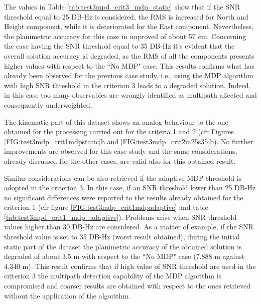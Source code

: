 The values in Table \ref{tab:test3mpd_crit3_mdp_static} show that if the SNR threshold equal to 25 DB-Hz is considered, the RMS is increased for North and Height component, while it is deteriorated for the East component. Nevertheless, the planimetric accuracy for this case in improved of about 57 cm. 
Concerning the case having the SNR threshold equal to 35 DB-Hz it's evident that the overall solution accuracy id degraded, as the RMS of all the components presents higher values with respect to the ``No MDP" case. This results confirms what has already been observed for the previous case study, i.e., using the MDP algorithm with high SNR threshold in the criterion 3 leads to a degraded solution. Indeed, 
in this case too many observables are wrongly identified as multipath affected and consequently underweighted.

The kinematic part of this dataset shows an analog behaviour to the one obtained for the processing carried out for the criteria 1 and 2 (cfr Figures \ref{FIG:test3mdp_crit1mdpstatic}b and \ref{FIG:test3mdp_crit2m25s35}b). No further improvements are observed for this case study and the same considerations, already discussed for the other cases, are valid also for this obtained result. 

Similar considerations can be also retrieved if the adaptive MDP threshold is adopted in the criterion 3. In this case, if an SNR threshold lower than 25 DB-Hz no significant differences were reported to the results already obtained for the criterion 1 (cfr figure \ref{FIG:test3mdp_crit1mdpadaptive} and table \ref{tab:test3mpd_crit1_mdp_adaptive}). Problems arise when SNR threshold values higher than 30 DB-Hz are considered. As a matter of example, if the SNR threshold value is set to 35 DB-Hz (worst result obtained), during the initial static part of the dataset the planimetric accuracy of the obtained solution is degraded of about 3.5 m with respect to the ``No MDP" case (7.888 m against 4.340 m). This result confirms that if high value of SNR threshold are used in the criterion 3 the multipath detection capability of the MDP algorithm is compromised and coarser results are obtained with respect to the ones retrieved without the application of the algorithm. 



